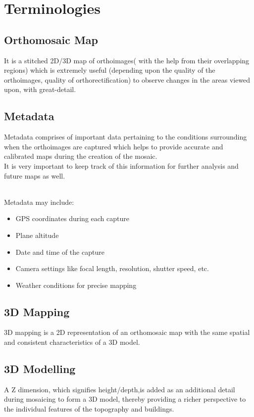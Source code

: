 \documentclass[11pt,twocolumn,letterpaper]{article}
\begin{document}
\section{Terminologies}
\subsection{Orthomosaic Map}

It is a stitched 2D/3D map of orthoimages( with the help from their overlapping regions) which is extremely useful (depending upon the quality of the orthoimages, quality of orthorectification) to observe changes in the areas viewed upon, with great-detail. 

\subsection{Metadata}

Metadata comprises of important data pertaining to the conditions surrounding when the orthoimages are captured which helps to provide accurate and calibrated maps during the creation of the mosaic.
\\ It is very important to keep track of this information for further analysis and future maps as well.

\\ Metadata may include:
\begin{itemize}
    \item GPS coordinates during each capture
    \item Plane altitude
    \item Date and time of the capture
    \item Camera settings like focal length, resolution, shutter speed, etc.
    \item Weather conditions for precise mapping
\end{itemize}



\subsection{3D Mapping}
3D mapping is a 2D representation of an orthomosaic map with the same spatial and consistent characteristics of a 3D model.

\subsection{3D Modelling}
A Z dimension, which signifies height/depth,is added as an additional detail during mosaicing to form a 3D model, thereby providing a richer perspective to the individual features of the topography and buildings.
\end{document}
